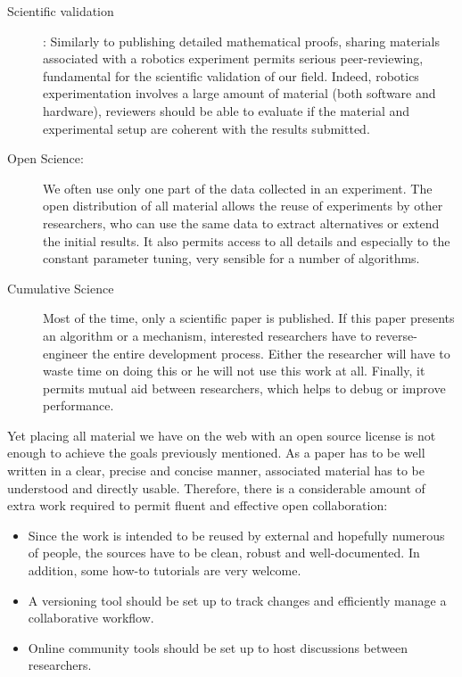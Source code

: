 \begin{description}
    \item[Scientific validation]: Similarly to publishing detailed mathematical proofs, sharing materials associated with a robotics experiment permits serious peer-reviewing, fundamental for the scientific validation of our field.
    Indeed, robotics experimentation involves a large amount of material (both software and hardware), reviewers should be able to evaluate if the material and experimental setup are coherent with the results submitted.

    \item[Open Science:] We often use only one part of the data collected in an experiment. The open distribution of all material allows the reuse of experiments by other researchers, who can use the same data to extract alternatives or extend the initial results.
    It also permits access to all details and especially to the constant parameter tuning, very sensible for a number of algorithms.

    \item[Cumulative Science] Most of the time, only a scientific paper is published. If this paper presents an algorithm or a mechanism, interested researchers have to reverse-engineer the entire development process. Either the researcher will have to waste time on doing this or he will not use this work at all.
    Finally, it permits mutual aid between researchers, which helps to debug or improve performance.

\end{description}


Yet placing all material we have on the web with an open source license is not enough to achieve the goals previously mentioned. As a paper has to be well written in a clear, precise and concise manner, associated material has to be understood and directly usable.
Therefore, there is a considerable amount of extra work required to permit fluent and effective open collaboration:
\begin{itemize}
    \item Since the work is intended to be reused by external and hopefully numerous of people, the sources have to be clean, robust and well-documented. In addition, some how-to tutorials are very welcome.
    \item A versioning tool should be set up to track changes and efficiently manage a collaborative workflow.
    \item Online community tools should be set up to host discussions between researchers.
\end{itemize}

